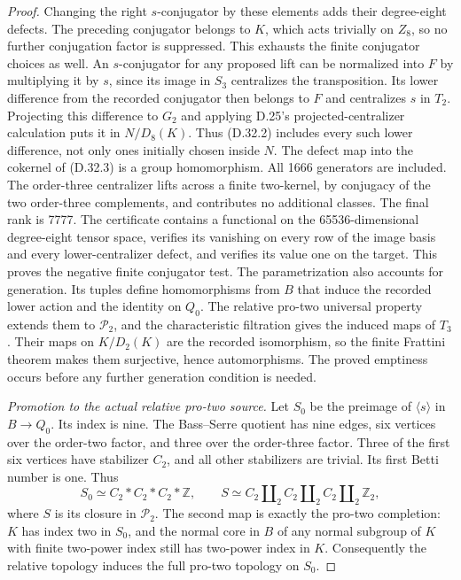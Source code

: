 \begin{proof}
Changing the right $s$-conjugator by these elements
adds their degree-eight defects. The preceding
conjugator belongs to $K$, which acts trivially on
$Z_8$, so no further conjugation factor is suppressed.
This exhausts the finite conjugator choices as well.
An $s$-conjugator for any proposed lift can be
normalized into $F$ by multiplying it by $s$, since
its image in $S_3$ centralizes the transposition.
Its lower difference from the recorded conjugator
then belongs to $F$ and centralizes $s$ in $T_2$.
Projecting this difference to $G_2$ and applying
D.25's projected-centralizer calculation puts it
in $N/D_8(K)$. Thus (D.32.2) includes every such
lower difference, not only ones initially chosen
inside $N$.
The defect map into the cokernel of (D.32.3) is a
group homomorphism. All 1666 generators are included.
The order-three centralizer lifts across a finite
two-kernel, by conjugacy of the two order-three
complements, and contributes no additional classes.
The final rank is 7777. The certificate contains a
functional on the 65536-dimensional degree-eight
tensor space, verifies its vanishing on every row
of the image basis and every lower-centralizer
defect, and verifies its value one on the target.
This proves the negative finite conjugator test.
The parametrization also accounts for generation.
Its tuples define homomorphisms from $B$ that induce
the recorded lower action and the identity on $Q_0$.
The relative pro-two universal property extends
them to $\mathcal P_2$, and the characteristic
filtration gives the induced maps of $T_3$.
Their maps on $K/D_2(K)$ are the recorded
isomorphism, so the finite Frattini theorem makes
them surjective, hence automorphisms. The proved
emptiness occurs before any further generation
condition is needed.

\emph{Promotion to the actual relative pro-two source.}
Let $S_0$ be the preimage of $\langle s\rangle$
in $B\to Q_0$. Its index is nine. The Bass--Serre
quotient has nine edges, six vertices over the
order-two factor, and three over the order-three
factor. Three of the first six vertices have
stabilizer $C_2$, and all other stabilizers are
trivial. Its first Betti number is one. Thus
\[
 S_0\simeq C_2*C_2*C_2*\mathbb Z,\qquad
 S\simeq C_2\amalg_2 C_2\amalg_2 C_2\amalg_2\mathbb Z_2,
                                                            \tag{D.32.8}
\]
where $S$ is its closure in $\mathcal P_2$.
The second map is exactly the pro-two completion:
$K$ has index two in $S_0$, and the normal core
in $B$ of any normal subgroup of $K$ with finite
two-power index still has two-power index in $K$.
Consequently the
relative topology induces the full pro-two topology
on $S_0$.


\end{proof}
